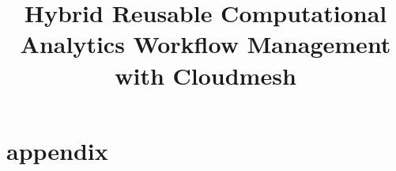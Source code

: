 \documentclass[sigplan,screen]{acmart}
\begin{document}
\title{Hybrid Reusable Computational Analytics Workflow Management with Cloudmesh}

% 

\begin{abstract}



\end{abstract}


  



\maketitle












\TODO{-----------------------------------------------}






















\section{appendix}



\end{document}
